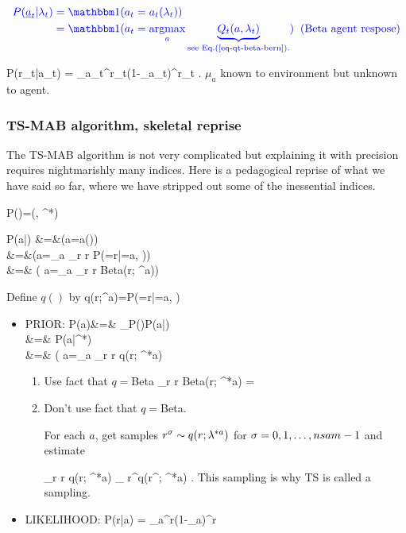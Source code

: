 \begin{align}\color{blue}
P(\rva_t|\lam_t)
&\color{blue}= \indi( a_t=a_t(\lam_t))
\\
&\color{blue}= \indi( a_t=\argmax_a
\underbrace{ Q_t(a, \lam_t)}_
{\text{see Eq.(\ref{eq-qt-beta-bern}).}}
)
\;\;\text{(Beta agent respose)}
\end{align}

\beq\color{blue}
P(r_t|a_t) =
\mu_{a_t}^{r_t}(1-\mu_{a_t})^{r_t}
\;\;
\;.
\eeq
$\mu_a$ known to environment
but unknown to agent.

\subsubsection{TS-MAB 
algorithm, skeletal reprise}

The TS-MAB algorithm
is not very 
complicated but explaining
it with precision
requires nightmarishly many
indices.
Here is a pedagogical reprise
of what we have said so far,
where we have 
stripped out some of the
inessential indices.




\beq
P(\lam)=\indi(\lam, \lam^*)
\eeq

\beqa
P(a|\lam)
&=&\indi(a=a(\lam))
\\
&=&\indi(a=\argmax_a \sum_r r P(=r|=a, \lam))
\\
&=& \indi( a=\argmax_a \sum_r r {\rm Beta}(r; \lam^a))
\;\;
\eeqa

Define $q()$ by
\beq
q(r;\lam^a)=P(=r|=a, \lam)
\eeq

\begin{itemize}
\item PRIOR:
\beqa
P(a)&=&
\sum_\lam P(\lam)P(a|\lam)
\\
&=&
P(a|\lam^*)
\\
&=&
\indi( a=\argmax_a
 \sum_r r q(r; \lam^{*a})
\eeqa


\begin{enumerate}
\item Use fact that $q=$Beta
\beq
\sum_r r {\rm Beta}(r; \lam^{*a})
=
\eeq

\item Don't use fact that $q=$Beta.

 For each $a$,
get samples $r^\sigma \sim
q(r; \lambda^{*a})$
for $\sigma=0, 1, \ldots, nsam-1$
and estimate

\beq
\sum_r r q(r; \lam^{*a})
\approx
{}\sum_\s
r^\s q(r^\s; \lam^{*a})
\;.
\eeq
This sampling is why TS is called a sampling.
\end{enumerate}


\item LIKELIHOOD:
\beq
P(r|a) =
\mu_{a}^{r}(1-\mu_{a})^{r}
\;\;
\eeq
\end{itemize}



